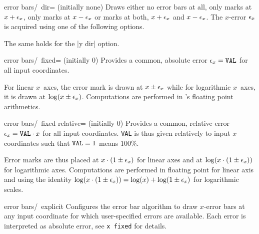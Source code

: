 {\begin{codeexample}[]
\end{codeexample}

\begin{pgfplotsxykey}{error bars/\x\ dir= (initially none)}
Draws either no error bars at all, only marks at $x+\epsilon_{x}$, only marks at $x-\epsilon_{x}$ or marks at both, $x+\epsilon_{x}$ and $x-\epsilon_{x}$. The $x$-error $\epsilon_{x}$ is acquired using one of the following options.

The same holds for the |y dir| option.
\end{pgfplotsxykey}

\begin{pgfplotsxykey}{error bars/\x\ fixed= (initially 0)}
Provides a common, absolute error $\epsilon_{x}=\text{\texttt{VAL}}$ for all input coordinates.

For linear $x$~axes, the error mark is drawn at $x \pm \epsilon_{x}$ while for logarithmic $x$~axes, it is drawn at $\log( x \pm \epsilon_{x})$. Computations are performed in \PGF's floating point arithmetics.
\end{pgfplotsxykey}

\begin{pgfplotsxykey}{error bars/\x\ fixed relative= (initially 0)}
Provides a common, relative error $\epsilon_{x} = \text{\texttt{VAL}} \cdot x$ for all input coordinates. \texttt{VAL} is thus given relatively to input $x$ coordinates such that $\text{\texttt{VAL}} = 1$ means $100\%$.

Error marks are thus placed at $x \cdot (1 \pm \epsilon_{x})$ for linear axes and at $\log(x \cdot (1 \pm \epsilon_{x}))$ for logarithmic axes. Computations are performed in floating point for linear axis and using the identity $\log(x \cdot (1 \pm \epsilon_{x})) = \log(x) + \log( 1 \pm \epsilon_{x})$ for logarithmic scales.
\end{pgfplotsxykey}

\begin{pgfplotsxykey}{error bars/\x\ explicit}
Configures the error bar algorithm to draw $x$-error bars at any input coordinate for which user-specified errors are available.
 Each error is interpreted as absolute error, see \texttt{x fixed} for details.


\end{pgfplotsxykey}}
